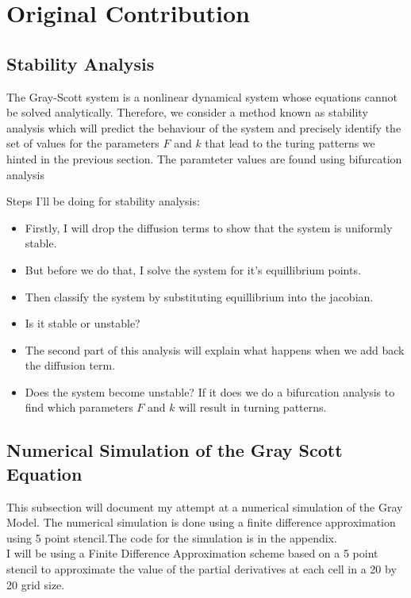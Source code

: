 
\section{Original Contribution}
\label{sec:simulations}



\subsection*{Stability Analysis}

The Gray-Scott system is a nonlinear dynamical system whose equations cannot be solved analytically. Therefore, we consider a method known as stability analysis which will predict the behaviour of the system and precisely identify the set of values for the parameters $F$ and $k$ that lead to the turing patterns we hinted in the previous section. The paramteter values are found using bifurcation analysis

Steps I'll be doing for stability analysis:
\begin{itemize}
	\item  Firstly, I will drop the diffusion terms to show that the system is uniformly stable.
	\item But before we do that, I solve the system for it's equillibrium points.
	\item Then classify the system by substituting equillibrium into the jacobian.
	\item Is it stable or unstable?
	\item The second part of this analysis will explain what happens when we add back the diffusion term.
	\item Does the system become unstable? If it does we do a bifurcation analysis to find which parameters $F$ and $k$ will result in turning patterns.
\end{itemize}
\subsection*{Numerical Simulation of the Gray Scott Equation}
This subsection will document my attempt at a numerical simulation of the Gray Model. The numerical simulation is done using a finite difference approximation using 5 point stencil.The code for the simulation is in the appendix.
\\
I will be using a Finite Difference Approximation scheme based on a 5 point stencil to approximate the value of the partial derivatives at each cell in a 20 by 20 grid size.








